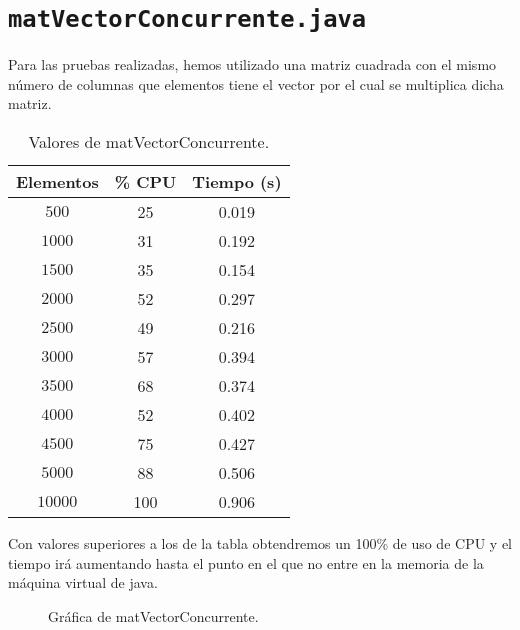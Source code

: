 \documentclass[12pt,letterpaper]{article}
\begin{document}
\section{\texttt{matVectorConcurrente.java}}
\noindent
Para las pruebas realizadas, hemos utilizado una matriz cuadrada con el mismo número de columnas que elementos tiene el vector por el cual se multiplica dicha matriz.
\begin{center}
	\begin{table}[htbp]
		\begin{center}
			\begin{tabular}{|c|c|c|}
				\hline
				\textbf{Elementos} & \textbf{\% CPU} & \textbf{Tiempo (s)}  \\
				\hline 
				$500$ & 25 & 0.019\\ \hline	
				$1000$ & 31 & 0.192\\ \hline
				$1500$ & 35 & 0.154\\ \hline
				$2000$ & 52 & 0.297\\ \hline
				$2500$ & 49 & 0.216\\ \hline
				$3000$ & 57 & 0.394\\ \hline
				$3500$ & 68 & 0.374\\ \hline
				$4000$ & 52 & 0.402\\ \hline
				$4500$ & 75 & 0.427\\ \hline
				$5000$ & 88 & 0.506\\ \hline				
				$10000$ & 100 & 0.906\\ \hline	
			\end{tabular}
			\caption{Valores de matVectorConcurrente.}
			\label{tabla:Valores de matVectorConcurrente}
		\end{center}
	\end{table}
\end{center}
\noindent
Con valores superiores a los de la tabla obtendremos un 100\% de uso de CPU y el tiempo irá aumentando hasta el punto en el que no entre en la memoria de la máquina virtual de java.
\begin{figure}
	\begin{center}
		\caption{Gráfica de matVectorConcurrente.}
		\label{fig: matVectorConcurrente}
	\end{center}	
\end{figure}


\newpage
\end{document}

